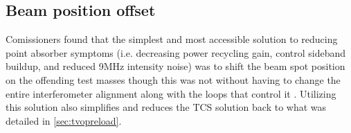 

\subsection{Beam position offset}
Comissioners found that the simplest and most accessible solution to reducing point absorber symptoms (i.e. decreasing power recycling gain, control sideband buildup, and reduced 9MHz intensity noise) was to shift the beam spot position on the offending test masses \cite{elog:2019_02_23:driggers} though this was not without having to change the entire interferometer alignment along with the loops that control it \cite{elog:2019_02_25:driggers}. Utilizing this solution also simplifies and reduces the TCS solution back to what was detailed in \autoref{sec:tvopreload}.







